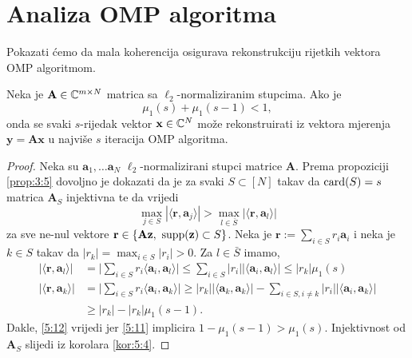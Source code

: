 \documentclass[a4paper,twoside,12pt]{memoir} %
\newcommand{\vect}[1]{\mathbf{#1}}
\renewcommand{\vec}{\vect}
\newcommand{\card}{\text{\normalfont{card}}}
\newcommand{\supp}{\text{\normalfont{supp}}}
\begin{document}
\newpage
\section[Analiza OMP algoritma][Analiza OMP algoritma]{Analiza OMP algoritma}
Pokazati \'cemo da mala koherencija osigurava rekonstrukciju rijetkih vektora OMP algoritmom.
\begin{thm}\label{tm:5:14}
    Neka je $\vec A \in \C^{m \times N}$ matrica sa $\ell_2$-normaliziranim stupcima. Ako je 
    \begin{equation}\label{5:11}
        \mu_1(s) + \mu_1(s-1) < 1, 
    \end{equation}
    onda se svaki $s$-rijedak vektor $\vec x \in \C^N$ mo\v{z}e rekonstruirati iz vektora mjerenja $\vec y = \vec{Ax}$ u najvi\v{s}e $s$ iteracija OMP algoritma.
\end{thm}
\begin{proof}
    Neka su $\vec a_1, \dots \vec a_N$ $\ell_2$-normalizirani stupci matrice $\vec A$. Prema propoziciji \ref{prop:3:5} dovoljno je dokazati da je za svaki $S \subset [N]$ takav da $\card(S) = s$ matrica $\vec A_S$ injektivna te da vrijedi
    \begin{equation}\label{5:12}
        \max_{j \in S} |\langle \vec r,\vec a_j \rangle|  > \max_{l \in \bar S} |\langle \vec r, \vec a_l \rangle|
    \end{equation}
    za sve ne-nul vektore $\vec r \in \{\vec{Az},\ \supp(\vec z) \subset S\}$. Neka je $\vec r := \sum_{i \in S}r_i \vec a_i$ i neka je $k \in S$ takav da $|r_k| = \max_{i \in S} |r_i| > 0$. Za $l \in \bar S$ imamo,
    \begin{align*}
        |\langle \vec r, \vec a_l \rangle| &= \big | \sum_{i \in S}r_i \langle \vec a_i, \vec a_l \rangle \big | \leq \sum_{i \in S}|r_i||\langle \vec a_i, \vec a_l \rangle| \leq |r_k| \mu_1(s) \\
        |\langle \vec r, \vec a_k \rangle| &= \big | \sum_{i \in S}r_i \langle \vec a_i, \vec a_k \rangle \big |  \geq |r_k| |\langle \vec a_k, \vec a_k \rangle| - \sum_{i \in S, i \neq k}|r_i||\langle \vec a_i, \vec a_k \rangle| \\
        &\geq |r_k| - |r_k|\mu_1(s-1).
    \end{align*}
    Dakle, \eqref{5:12} vrijedi jer \eqref{5:11} implicira $1-\mu_1(s-1) > \mu_1(s)$. Injektivnost od $\vec A_S$ slijedi iz korolara \ref{kor:5:4}.
\end{proof}
\end{document}
